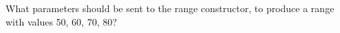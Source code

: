  \label{sssec:ex1_9}

What parameters should be sent to the range constructor, to produce a
range with values 50, 60, 70, 80?

